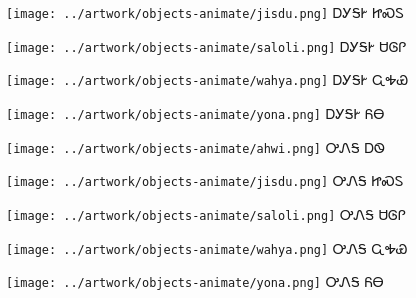 \documentclass[avery5371,frame]{flashcards}%
\begin{document}
\begin{flashcard}{
\texttt{[image: ../artwork/objects-animate/jisdu.png]}
}\Huge ᎠᎩᎦᎨ ᏥᏍᏚ
\end{flashcard}

\begin{flashcard}{
\texttt{[image: ../artwork/objects-animate/saloli.png]}
}\Huge ᎠᎩᎦᎨ ᏌᎶᎵ
\end{flashcard}

\begin{flashcard}{
\texttt{[image: ../artwork/objects-animate/wahya.png]}
}\Huge ᎠᎩᎦᎨ ᏩᎭᏯ
\end{flashcard}

\begin{flashcard}{
\texttt{[image: ../artwork/objects-animate/yona.png]}
}\Huge ᎠᎩᎦᎨ ᏲᎾ
\end{flashcard}

\begin{flashcard}{
\texttt{[image: ../artwork/objects-animate/ahwi.png]}
}\Huge ᎤᏁᎦ ᎠᏫ
\end{flashcard}

\begin{flashcard}{
\texttt{[image: ../artwork/objects-animate/jisdu.png]}
}\Huge ᎤᏁᎦ ᏥᏍᏚ
\end{flashcard}

\begin{flashcard}{
\texttt{[image: ../artwork/objects-animate/saloli.png]}
}\Huge ᎤᏁᎦ ᏌᎶᎵ
\end{flashcard}

\begin{flashcard}{
\texttt{[image: ../artwork/objects-animate/wahya.png]}
}\Huge ᎤᏁᎦ ᏩᎭᏯ
\end{flashcard}

\begin{flashcard}{
\texttt{[image: ../artwork/objects-animate/yona.png]}
}\Huge ᎤᏁᎦ ᏲᎾ
\end{flashcard}
\end{document}
